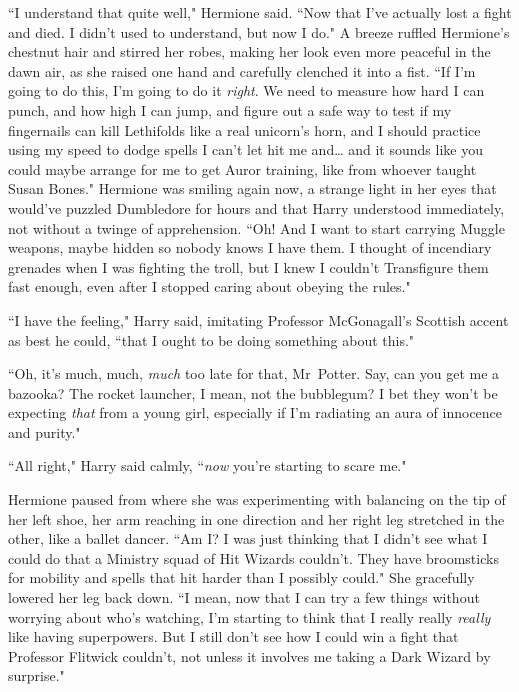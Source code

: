 ``I understand that quite well," Hermione said. ``Now that I've actually lost a fight and died. I didn't used to understand, but now I do." A breeze ruffled Hermione's chestnut hair and stirred her robes, making her look even more peaceful in the dawn air, as she raised one hand and carefully clenched it into a fist. ``If I'm going to do this, I'm going to do it \emph{right}. We need to measure how hard I can punch, and how high I can jump, and figure out a safe way to test if my fingernails can kill Lethifolds like a real unicorn's horn, and I should practice using my speed to dodge spells I can't let hit me and{\ldots} and it sounds like you could maybe arrange for me to get Auror training, like from whoever taught Susan Bones." Hermione was smiling again now, a strange light in her eyes that would've puzzled Dumbledore for hours and that Harry understood immediately, not without a twinge of apprehension. ``Oh! And I want to start carrying Muggle weapons, maybe hidden so nobody knows I have them. I thought of incendiary grenades when I was fighting the troll, but I knew I couldn't Transfigure them fast enough, even after I stopped caring about obeying the rules."

``I have the feeling," Harry said, imitating Professor McGonagall's Scottish accent as best he could, ``that I ought to be doing something about this."

``Oh, it's much, much, \emph{much} too late for that, Mr~Potter. Say, can you get me a bazooka? The rocket launcher, I mean, not the bubblegum? I bet they won't be expecting \emph{that} from a young girl, especially if I'm radiating an aura of innocence and purity."

``All right," Harry said calmly, ``\emph{now} you're starting to scare me."

Hermione paused from where she was experimenting with balancing on the tip of her left shoe, her arm reaching in one direction and her right leg stretched in the other, like a ballet dancer. ``Am I? I was just thinking that I didn't see what I could do that a Ministry squad of Hit Wizards couldn't. They have broomsticks for mobility and spells that hit harder than I possibly could." She gracefully lowered her leg back down. ``I mean, now that I can try a few things without worrying about who's watching, I'm starting to think that I really really \emph{really} like having superpowers. But I still don't see how I could win a fight that Professor Flitwick couldn't, not unless it involves me taking a Dark Wizard by surprise."

